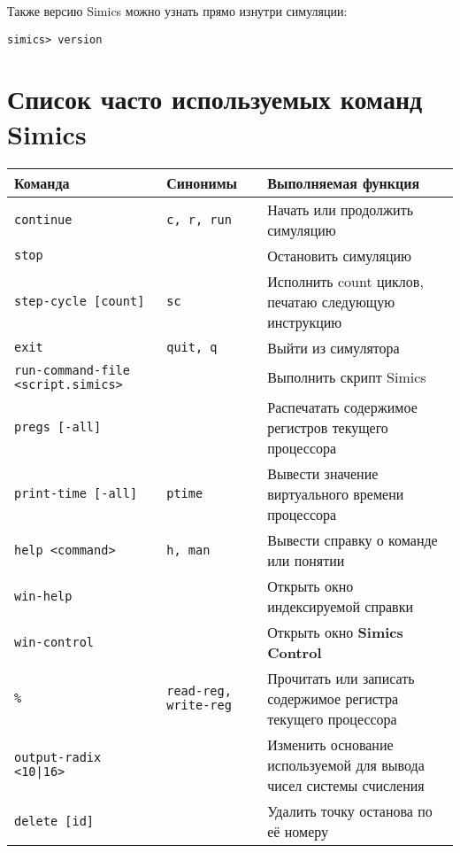 Также версию Simics можно узнать прямо изнутри симуляции:

\begin{lstlisting}
simics> version
\end{lstlisting}

\section{Список часто используемых команд Simics}

\begin{center}
\begin{tabularx}{\textwidth}{|X|X|p{}|}\hline
\textbf{Команда}                          & \textbf{Синонимы}  & \textbf{Выполняемая функция}\\\hline
\texttt{continue}                         & \texttt{c, r, run} & Начать или продолжить симуляцию\\\hline
\texttt{stop}     						  &                    & Остановить симуляцию\\\hline
\texttt{step-cycle [count]}				  & \texttt{sc}		   & Исполнить count циклов, печатаю следующую инструкцию\\\hline
\texttt{exit}     						  & \texttt{quit, q}   & Выйти из симулятора\\\hline
\texttt{run-command-file <script.simics>} &                    & Выполнить скрипт Simics\\\hline
\texttt{pregs [-all]}                     &                    & Распечатать содержимое регистров текущего процессора\\\hline
\texttt{print-time [-all]}                & \texttt{ptime}     & Вывести значение виртуального времени процессора\\\hline
\texttt{help <command>}                   & \texttt{h, man}    & Вывести справку о команде или понятии \\\hline
\texttt{win-help}                         &                    & Открыть окно индексируемой справки \\\hline
\texttt{win-control}                      &                    & Открыть окно \textbf{Simics Control}\\\hline
\texttt{\%<register name>}                & \texttt{read-reg, write-reg} & Прочитать или записать содержимое регистра текущего процессора \\\hline
\texttt{output-radix <10|16>}             &                    & Изменить основание используемой для вывода чисел системы счисления\\\hline
\texttt{delete [id]}                      &                    & Удалить точку останова по её номеру \\\hline
\end{tabularx}

\end{center}

